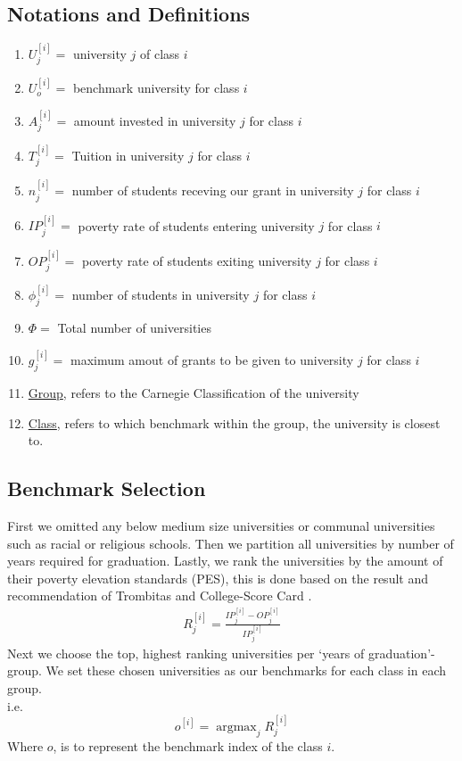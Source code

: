 \documentclass[12pt]{scrartcl}
\newcommand{\argmax}{\mathop{\mathrm{argmax}}}
\begin{document}
	\subsection{Notations and Definitions}
	\begin{enumerate}
		\item $U_j^{[i]} = $ university $j$ of class $i$
		\item $U_o^{[i]} = $ benchmark university for class $i$
		\item $A_j^{[i]} = $ amount invested in university $j$ for class $i$
		\item $T_j^{[i]} = $ Tuition in university $j$ for class $i$
		\item $n_j^{[i]} = $ number of students receving our grant in university $j$ for class $i$
		\item $IP_j^{[i]} = $ poverty rate of students entering university $j$ for class $i$
		\item $OP_j^{[i]} = $ poverty rate of students exiting university $j$ for class $i$
		\item $\phi_j^{[i]} = $ number of students in university $j$ for class $i$
		\item $\Phi = $ Total number of universities
		\item $g_j^{[i]} = $ maximum amout of grants to be given to university $j$ for class $i$
		\item \underline{Group}, refers to the Carnegie Classification of the university
		\item \underline{Class}, refers to which benchmark within the group, the university is closest to.
	\end{enumerate}
	
	\subsection{Benchmark Selection}
		First we omitted any below medium size universities or communal universities such as racial or religious schools. Then we partition all universities by number of years required for graduation. Lastly, we rank the universities by the amount of their poverty elevation standards (PES), this is done based on the result and recommendation of Trombitas \cite{Trom} and College-Score Card \cite{US}.\\ 
		\begin{align}
			R_j^{[i]}=\frac{IP_j^{[i]}-OP_j^{[i]}}{IP_j^{[i]}}
		\end{align}
		Next we choose the top, highest ranking universities per `years of graduation'-group. We set these chosen universities as our benchmarks for each class in each group.\\
		i.e.
		$$
			o^{[i]} = \argmax_{j} R_j^{[i]}
		$$
		Where $o$, is to represent the benchmark index of the class $i$.
\end{document}
